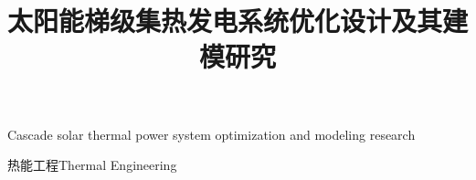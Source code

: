 \makenomenclature

\title{太阳能梯级集热发电系统优化设计及其建模研究}{Cascade solar thermal power system optimization and modeling research}
\author
{}{}
\major
{热能工程}{Thermal Engineering}
\supervisor
{}{}
